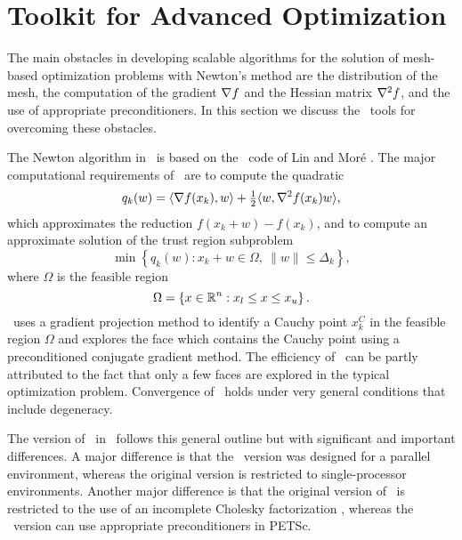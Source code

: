 \section{Toolkit for Advanced Optimization}

\label{sec:tao}

\begin{comment}
Scalable algorithms for mesh-based optimization problems of
the form \Ref{eq:opt-mesh} generally require mesh-invariance
in the sense that the number of iterations is independent of
the mesh spacing.  In theory, mesh-invariance can be
obtained with Newton's method \cite{ALD00}, although in practice
there are numerous obstacles. In this section we discuss the
computational requirements of a Newton method in \tao\ for
mesh-based problems.  We illustrate our results with a
benchmark obstacle problem based on a minimal surface
problem.
  
\end{comment}

The main obstacles in developing scalable algorithms for the
solution of mesh-based optimization problems with Newton's
method are the distribution of the mesh, the computation of
the gradient $ \nabla f $ and the Hessian matrix $ \nabla^2 f
$, and the use of appropriate preconditioners.
In this section we discuss the \tao\ tools for 
overcoming these obstacles.


The Newton algorithm in \tao\ is based on the
\tron\ code of Lin and Mor\'e \cite{CJL99,tron-home}.
The major computational requirements of \tron\ 
are to compute the quadratic
\[
q_k (w) = \langle \nabla f ( x_k ) , w \rangle + {\textstyle{\frac{1}{2}}}
                \langle w , \nabla^2 f (x_k ) w \rangle ,
\]
which approximates the reduction $ f ( x_k + w ) - f ( x_k ) $,
and to compute an approximate solution of 
the trust region subproblem
\[
\min \left \{ q_k (w) : x_k + w  \in \Omega,
\ \| w \| \le \Delta_k \right \} ,
\]
where $ \Omega $ is the feasible region
\[
\Omega = \left \{ x \in \mbox{${\mathbb R}$}^n : x_l \le x \le x_u \right \} .
\]
\tron\ uses a gradient projection method to identify a Cauchy
point $ x_k^C $ in the feasible region $ \Omega $ and
explores the face which contains the Cauchy point using
a preconditioned conjugate gradient method.  The
efficiency of \tron\ can be partly attributed to the fact
that only a few faces are explored in the typical
optimization problem.  Convergence of \tron\ holds under
very general conditions that include degeneracy.

The version of \tron\ in \tao\ follows this general outline
but with significant and important differences.  A major
difference is that the \tao\ version was designed for a
parallel environment, whereas the original version is
restricted to single-processor environments.
Another major difference is that the original version
of \tron\ is restricted to the use of an incomplete
Cholesky factorization \cite{CJL99a}, whereas the
\tao\ version can use appropriate preconditioners in
PETSc.

